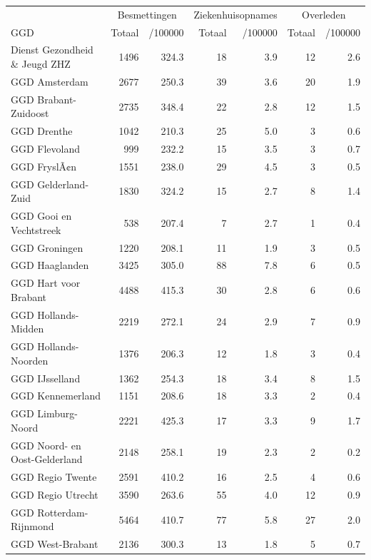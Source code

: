 \documentclass[
  english,
  man,floatsintext]{apa6}
\begin{document}
\begin{table}
\centering\begingroup\fontsize{10}{12}\selectfont

\begin{threeparttable}
\begin{tabular}{lrrrrrr}
\toprule
\multicolumn{1}{c}{ } & \multicolumn{2}{c}{Besmettingen} & \multicolumn{2}{c}{Ziekenhuisopnames} & \multicolumn{2}{c}{Overleden} \\
\cmidrule(l{3pt}r{3pt}){2-3} \cmidrule(l{3pt}r{3pt}){4-5} \cmidrule(l{3pt}r{3pt}){6-7}
GGD & Totaal & /100000 & Totaal & /100000 & Totaal & /100000\\
\midrule
Dienst Gezondheid \& Jeugd ZHZ & 1496 & 324.3 & 18 & 3.9 & 12 & 2.6\\
GGD Amsterdam & 2677 & 250.3 & 39 & 3.6 & 20 & 1.9\\
GGD Brabant-Zuidoost & 2735 & 348.4 & 22 & 2.8 & 12 & 1.5\\
GGD Drenthe & 1042 & 210.3 & 25 & 5.0 & 3 & 0.6\\
GGD Flevoland & 999 & 232.2 & 15 & 3.5 & 3 & 0.7\\
GGD FryslÃ¢n & 1551 & 238.0 & 29 & 4.5 & 3 & 0.5\\
GGD Gelderland-Zuid & 1830 & 324.2 & 15 & 2.7 & 8 & 1.4\\
GGD Gooi en Vechtstreek & 538 & 207.4 & 7 & 2.7 & 1 & 0.4\\
GGD Groningen & 1220 & 208.1 & 11 & 1.9 & 3 & 0.5\\
GGD Haaglanden & 3425 & 305.0 & 88 & 7.8 & 6 & 0.5\\
GGD Hart voor Brabant & 4488 & 415.3 & 30 & 2.8 & 6 & 0.6\\
GGD Hollands-Midden & 2219 & 272.1 & 24 & 2.9 & 7 & 0.9\\
GGD Hollands-Noorden & 1376 & 206.3 & 12 & 1.8 & 3 & 0.4\\
GGD IJsselland & 1362 & 254.3 & 18 & 3.4 & 8 & 1.5\\
GGD Kennemerland & 1151 & 208.6 & 18 & 3.3 & 2 & 0.4\\
GGD Limburg-Noord & 2221 & 425.3 & 17 & 3.3 & 9 & 1.7\\
GGD Noord- en Oost-Gelderland & 2148 & 258.1 & 19 & 2.3 & 2 & 0.2\\
GGD Regio Twente & 2591 & 410.2 & 16 & 2.5 & 4 & 0.6\\
GGD Regio Utrecht & 3590 & 263.6 & 55 & 4.0 & 12 & 0.9\\
GGD Rotterdam-Rijnmond & 5464 & 410.7 & 77 & 5.8 & 27 & 2.0\\
GGD West-Brabant & 2136 & 300.3 & 13 & 1.8 & 5 & 0.7\\

\end{tabular}
\end{threeparttable}
\end{table}
\end{document}
